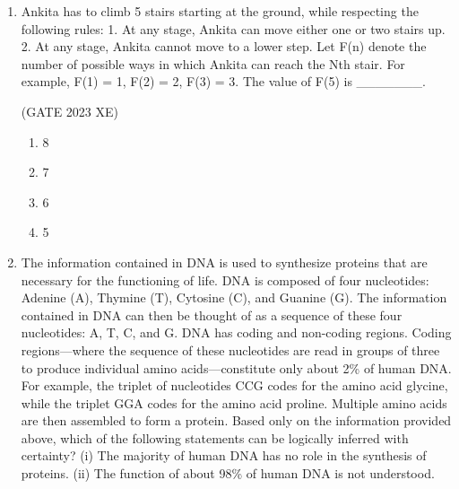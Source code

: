 \documentclass[journal,12pt,onecolumn]{IEEEtran}
\begin{document}
\begin{enumerate}
\begin{multicols}{2}
\begin{enumerate}
\item All academicians residing in the complex are well established in their fields.

\item Some authors of best-selling books are residents of the complex who are well 
established in their fields.

\item Some academicians residing in the complex are well established in their fields.

\end{enumerate}

\end{multicols}

\item Ankita has to climb 5 stairs starting at the ground, while respecting the following 
rules: 
1. At any stage, Ankita can move either one or two stairs up. 
2. At any stage, Ankita cannot move to a lower step. 
Let F(n) denote the number of possible ways in which Ankita can reach the Nth  stair. For example, F(1) = 1, F(2) =  2, F(3) =  3. 
The value of F(5) is \_\_\_\_\_\_\_.

\hfill{(GATE 2023 XE)}

\begin{multicols}{4}

\begin{enumerate}

\item 8

\item 7

\item 6

\item 5

\end{enumerate}

\end{multicols}

\item The information contained in DNA is used to synthesize proteins that are 
necessary for the functioning of life. DNA is composed of four nucleotides: 
Adenine (A), Thymine (T), Cytosine (C), and Guanine (G). The information 
contained in DNA can then be thought of as a sequence of these four nucleotides: 
A, T, C, and G. DNA has coding and non-coding regions. Coding regions—where 
the sequence of these nucleotides are read in groups of three to produce individual 
amino  
acids—constitute only about 2\% of human DNA. For example, the triplet of 
nucleotides CCG codes for the amino acid glycine, while the triplet GGA codes 
for the amino acid proline. Multiple amino acids are then assembled to form a 
protein.  
Based only on the information provided above, which of the following statements 
can be logically inferred with certainty? 
(i) 
The majority of human DNA has no role in the synthesis of proteins. 
(ii) 
The function of about 98\% of human DNA is not understood.


\end{enumerate}
\end{document}
